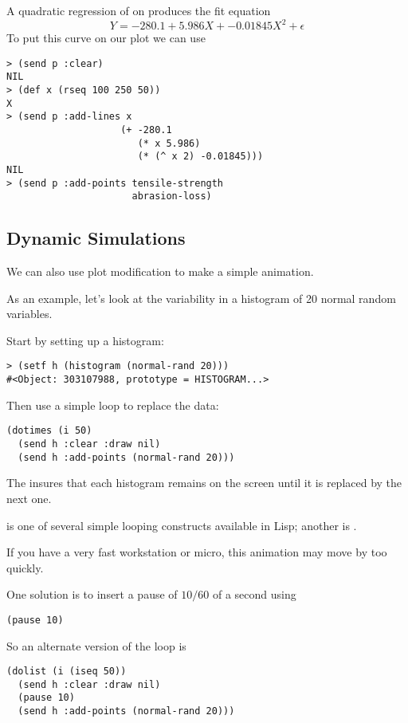 \begin{slide}{}
A quadratic regression of  on
 produces the fit equation
\begin{displaymath}
Y = -280.1 + 5.986 X + -0.01845 X^{2} + \epsilon
\end{displaymath}
To put this curve on our plot we can use
{\Large
\begin{verbatim}
> (send p :clear)
NIL
> (def x (rseq 100 250 50))
X
> (send p :add-lines x
                    (+ -280.1 
                       (* x 5.986)
                       (* (^ x 2) -0.01845)))
NIL
> (send p :add-points tensile-strength
                      abrasion-loss)
\end{verbatim}}
\end{slide}

\begin{slide}{}
\subsection{Dynamic Simulations}
We can also use plot modification to make a simple animation.

As an example, let's look at the variability in a histogram of 20
normal random variables.

Start by setting up a histogram:
{\Large
\begin{verbatim}
> (setf h (histogram (normal-rand 20)))
#<Object: 303107988, prototype = HISTOGRAM...>
\end{verbatim}}
Then use a simple loop to replace the data:
{\Large
\begin{verbatim}
(dotimes (i 50)
  (send h :clear :draw nil)
  (send h :add-points (normal-rand 20)))
\end{verbatim}}
The   insures that each histogram remains on
the screen until it is replaced by the next one.
\end{slide}

\begin{slide}{}
 is one of several simple looping constructs available
in Lisp; another is .

If you have a very fast workstation or micro, this animation may move
by too quickly.

One solution is to insert a pause of $10/60$ of a second using
\begin{verbatim}
(pause 10)
\end{verbatim}

So an alternate version of the loop is
{\Large
\begin{verbatim}
(dolist (i (iseq 50))
  (send h :clear :draw nil)
  (pause 10)
  (send h :add-points (normal-rand 20)))
\end{verbatim}}
\end{slide}

